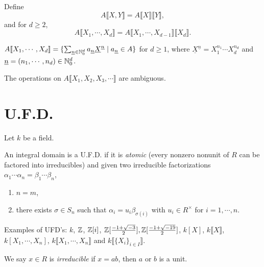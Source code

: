 \begin{definition}\label{1.70}
    Define
    \[A\llbracket X,Y \rrbracket = A\llbracket X \rrbracket \llbracket Y \rrbracket,\]
    and for $d \geq 2$,
    \[A\llbracket X_1,\cdots,X_d \rrbracket = A \llbracket X_1,\cdots,X_{d-1} \rrbracket \llbracket X_d \rrbracket.\]
\end{definition}

\begin{fact}\label{1.71}
    $A\llbracket X_1,\cdots,X_d \rrbracket = \{\sum_{\underline n \in \mathbb{N}_0^d} a_{\underline n} \underline X^{\underline n} \mid a_{\underline n} \in A\}$ for $d \geq 1$, where $\underline X^{\underline n} = X_1^{n_1} \cdots X_d^{n_d}$ and $\underline n = (n_1,\cdots,n_d) \in \mathbb{N}_0^d$.
\end{fact}

\begin{warning}\label{1.72}
    The operations on $A\llbracket X_1,X_2,X_3,\cdots \rrbracket$ are ambiguous.
\end{warning}


\section*{U.F.D.}

Let $k$ be a field.

\begin{definition}\label{1.73}
    An integral domain is a U.F.D. if it is \emph{atomic} (every nonzero nonunit of $R$ can be factored into irreducibles) and given two irreducible factorizations $\alpha_1 \cdots \alpha_n = \beta_1 \cdots \beta_n$,
    \begin{enumerate}
        \item $n = m$,
        \item there exists $\sigma \in S_n$ such that $\alpha_i = u_i \beta_{\sigma(i)}$ with $u_i \in R^{\times}$ for $i = 1,\cdots,n$.
    \end{enumerate}
\end{definition}

\begin{example}\label{1.74}
    Examples of UFD's: $k$, $\mathbb{Z}$, $\mathbb{Z}[i]$, $\mathbb{Z}[\frac{-1+\sqrt {-3}}{2}],\mathbb{Z}[\frac{-1+\sqrt{-19}}{2}]$, $k[X]$, $k\llbracket X \rrbracket$, $k[X_1,\cdots,X_n]$, $k\llbracket X_1,\cdots,X_n \rrbracket $ and $k\llbracket \{X_i\}_{i \in I} \rrbracket$.
\end{example}

\begin{definition}\label{1.75}
    We say $x \in R$ is \emph{irreducible} if $x = ab$, then $a$ or $b$ is a unit.
\end{definition}

